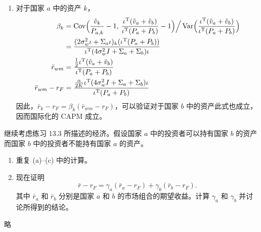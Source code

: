 \begin{solution}
\begin{enumerate}[label=(\alph*)]
    \item 对于国家 $a$ 中的资产 $k$，
    \[
        \begin{aligned}
            \beta_{k}&=\operatorname{Cov}\Bigl(\frac{\tilde{v}_{k}}{P_{a,k}}-1,\,\frac{\iota^{\mathrm{T}}(\tilde{v}_{a}+\tilde{v}_{b})}{\iota^{\mathrm{T}}(P_{a}+P_{b})}-1\Bigr)\Big/\operatorname{Var}\Bigl(\frac{\iota^{\mathrm{T}}(\tilde{v}_{a}+\tilde{v}_{b})}{\iota^{\mathrm{T}}(P_{a}+P_{b})}\Bigr)\\
            &=\frac{(2\sigma_{w}^{2}\iota+\Sigma_{a}\iota)_{k}(\iota^{\mathrm{T}}(P_{a}+P_{b}))}{\iota^{\mathrm{T}}(4\sigma_{w}^{2}I+\Sigma_{a}+\Sigma_{b})\iota}\\
            \bar{r}_{wm}&=\frac{\tfrac12\iota^{\mathrm{T}}(\tilde{v}_{a}+\tilde{v}_{b})}{\iota^{\mathrm{T}}(P_{a}+P_{b})}\\
            \bar{r}_{wm}-r_{F}&=\frac{\frac{\alpha}{2K}\iota^{\mathrm{T}}(4\sigma_{w}^{2}I+\Sigma_{a}+\Sigma_{b})\iota}{\iota^{\mathrm{T}}(P_{a}+P_{b})}
        \end{aligned}
    \]
    因此，$\bar{r}_{k}-r_{F}=\beta_{k}(\bar{r}_{wm}-r_{F})$，可以验证对于国家 $b$ 中的资产此式也成立，因而国际化的 CAPM 成立。
\end{enumerate}
\end{solution}

\begin{problem}
 继续考虑练习 13.3 所描述的经济。假设国家 $a$ 中的投资者可以持有国家 $b$ 的资产而国家 $b$ 中的投资者不能持有国家 $a$ 的资产。
\begin{enumerate}[label=(\alph*)]
    \item 重复 (a)--(c) 中的计算。
    \item 现在证明
    \[
        \bar{r}-r_{F}=\gamma_{a}(\bar{r}_{a}-r_{F})+\gamma_{b}(\bar{r}_{b}-r_{F}).
    \]
    其中 $\bar{r}_{a}$ 和 $\bar{r}_{b}$ 分别是国家 $a$ 和 $b$ 的市场组合的期望收益。计算 $\gamma_{a}$ 和 $\gamma_{b}$ 并讨论所得到的结论。
\end{enumerate}
\end{problem}
\begin{solution}
略
\end{solution}

